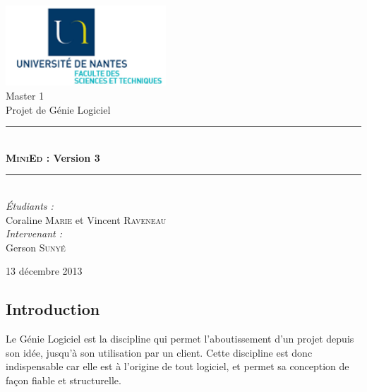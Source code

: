 \documentclass[a4paper]{article}
\newcommand{\HRule}{\rule{\linewidth}{0.5mm}}
\begin{document}
	\begin{titlepage}
		\begin{center}

			\includegraphics[width=0.45\textwidth]{UN-sciences.png}~\\[2cm]

			\LARGE{Master 1 }\\[1.5cm]

			\Large{Projet de Génie Logiciel}\\[0.5cm]

			\HRule \\[0.4cm]
			{ \huge \bfseries \textsc{MiniEd} : Version 3 \\[0.4cm] }
			\HRule \\[1.5cm]

			\normalsize		
			\emph{\'Etudiants :}\\
			Coraline \textsc{Marie} et Vincent \textsc{Raveneau}\\
			\vspace{0.5cm}
			\emph{Intervenant :} \\
			Gerson \textsc{Sunyé}
		
			\vfill

			{\large 13 décembre 2013}

		\end{center}
	\end{titlepage}


	\renewcommand{\contentsname}{Sommaire}
	\tableofcontents
	\newpage


	\begin{center}
		\section{Introduction}
	\end{center}

	\vspace{0.5cm}

	Le Génie Logiciel est la discipline qui permet l’aboutissement d’un projet depuis son idée, jusqu’à son utilisation par un client. Cette discipline est donc indispensable car elle est à l’origine de tout logiciel, et permet sa conception de façon fiable et structurelle.
\end{document}
